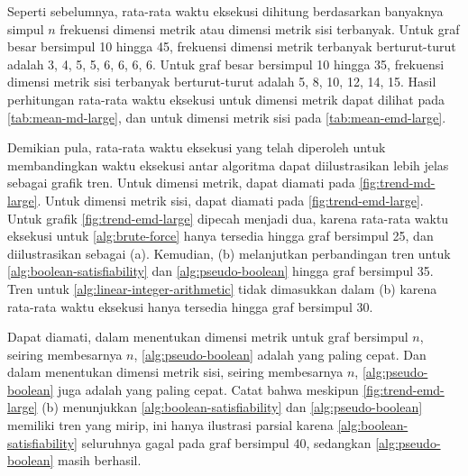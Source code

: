 Seperti sebelumnya, rata-rata waktu eksekusi dihitung berdasarkan banyaknya simpul \(n\) frekuensi dimensi metrik atau dimensi metrik sisi terbanyak. Untuk graf besar bersimpul 10 hingga 45, frekuensi dimensi metrik terbanyak berturut-turut adalah 3, 4, 5, 5, 6, 6, 6, 6. Untuk graf besar bersimpul 10 hingga 35, frekuensi dimensi metrik sisi terbanyak berturut-turut adalah 5, 8, 10, 12, 14, 15. Hasil perhitungan rata-rata waktu eksekusi untuk dimensi metrik dapat dilihat pada \autoref{tab:mean-md-large}, dan untuk dimensi metrik sisi pada \autoref{tab:mean-emd-large}.

Demikian pula, rata-rata waktu eksekusi yang telah diperoleh untuk membandingkan waktu eksekusi antar algoritma dapat diilustrasikan lebih jelas sebagai grafik tren. Untuk dimensi metrik, dapat diamati pada \autoref{fig:trend-md-large}. Untuk dimensi metrik sisi, dapat diamati pada \autoref{fig:trend-emd-large}. Untuk grafik \autoref{fig:trend-emd-large} dipecah menjadi dua, karena rata-rata waktu eksekusi untuk \autoref{alg:brute-force} hanya tersedia hingga graf bersimpul 25, dan diilustrasikan sebagai (a). Kemudian, (b) melanjutkan perbandingan tren untuk \autoref{alg:boolean-satisfiability} dan \autoref{alg:pseudo-boolean} hingga graf bersimpul 35. Tren untuk \autoref{alg:linear-integer-arithmetic} tidak dimasukkan dalam (b) karena rata-rata waktu eksekusi hanya tersedia hingga graf bersimpul 30.

Dapat diamati, dalam menentukan dimensi metrik untuk graf bersimpul \(n\), seiring membesarnya \(n\), \autoref{alg:pseudo-boolean} adalah yang paling cepat. Dan dalam menentukan dimensi metrik sisi, seiring membesarnya \(n\), \autoref{alg:pseudo-boolean} juga adalah yang paling cepat. Catat bahwa meskipun \autoref{fig:trend-emd-large} (b) menunjukkan \autoref{alg:boolean-satisfiability} dan \autoref{alg:pseudo-boolean} memiliki tren yang mirip, ini hanya ilustrasi parsial karena \autoref{alg:boolean-satisfiability} seluruhnya gagal pada graf bersimpul 40, sedangkan \autoref{alg:pseudo-boolean} masih berhasil.

\begin{landscape}
\begin{center}
	\renewcommand{\minipagewidth}{0.475\linewidth}

	\vphantom{}
	\vfill

	
	\hspace{2em}
	

	\vspace{2em}

	
	\hspace{2em}
	

	\vfill \vfill \vfill
\end{center}
\end{landscape}


